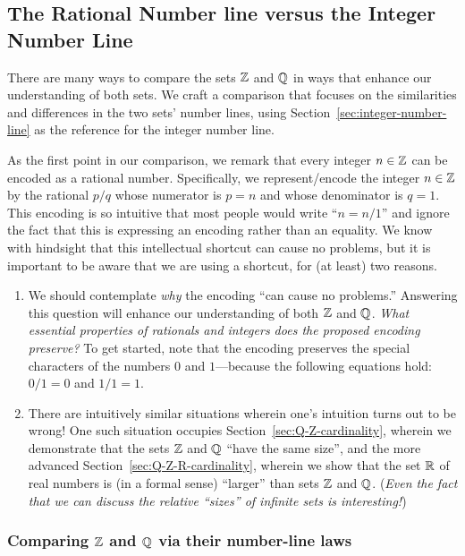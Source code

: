 \subsection{The Rational Number line versus the Integer Number Line}
\label{sec:Compare-Q-Z}

There are many ways to compare the sets $\mathbb{Z}$ and $\mathbb{Q}$ in ways that
enhance our understanding of both sets.  We craft a comparison that
focuses on the similarities and differences in the two sets' number
lines, using Section~\ref{sec:integer-number-line} as the reference
for the integer number line.

As the first point in our comparison, we remark that every integer $n
\in \mathbb{Z}$ can be encoded as a rational 
number.  Specifically, we represent/encode the integer $n \in \mathbb{Z}$ by
the rational $p/q$ whose numerator is $p = n$ and whose denominator is
$q = 1$.  This encoding is so intuitive that most people would write
``$n = n/1$'' and ignore the fact that this is expressing an encoding
rather than an equality.  We know with hindsight that this
intellectual shortcut can cause no problems, but it is important to be
aware that we are using a shortcut, for (at least) two reasons.
\begin{enumerate}
\item
We should contemplate {\em why} the encoding ``can cause no
problems.''  Answering this question will enhance our understanding of
both $\mathbb{Z}$ and $\mathbb{Q}$.  {\em What essential properties of rationals and
  integers does the proposed encoding preserve?}  To get started, note
that the encoding preserves the special characters of the numbers $0$
and $1$---because the following equations hold: $0/1 = 0$ and $1/1 =
1$.

\item
There are intuitively similar situations wherein one's intuition turns
out to be wrong!  One such situation occupies
Section~\ref{sec:Q-Z-cardinality}, wherein we demonstrate that the
sets $\mathbb{Z}$ and $\mathbb{Q}$ ``have the same size'', and the more advanced
Section~\ref{sec:Q-Z-R-cardinality}, wherein we show that the set $\mathbb{R}$
of real numbers is (in a formal sense) ``larger'' than sets $\mathbb{Z}$ and
$\mathbb{Q}$.  ({\em Even the fact that we can discuss the relative ``sizes''
  of infinite sets is interesting!})
\end{enumerate}

\subsubsection{Comparing $\mathbb{Z}$ and $\mathbb{Q}$ via their number-line laws}
\label{sec:Q-Z-laws}

